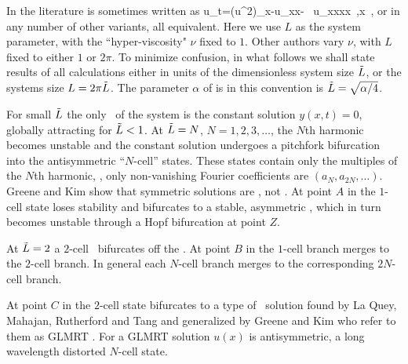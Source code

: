 In the literature  is sometimes written as
\beq
    u_t=(u^2)_x-u_{xx}- \nu \, u_{xxxx}
    \,,\qquad   x \in [0,L]
    \,,
or in any number of other variants, all equivalent.
Here we use
$L$ as the system parameter, with the ``hyper-viscosity" $\nu$ fixed to $1$.
Other authors vary  $\nu$, with $L$ fixed to either $1$ or $2\pi$.
To minimize confusion,
in what follows we shall state results of all 
calculations either in units of the dimensionless system size $\tilde{L}$,
or the systems size $L = 2 \pi \tilde{L}$. The parameter $\alpha$
of  is in this convention is
$\tilde{L}=\sqrt{\alpha/4}$.


For small $\tilde{L}$ the only \eqv\ of the system is the 
constant solution $y(x,t)=0$,
globally attracting 
for $\tilde{L}<1$. At $\tilde{L}=N$, $N=1,2,3, \dots$, 
the $N$th harmonic becomes unstable and the constant solution
undergoes a pitchfork bifurcation into
the antisymmetric ``$N$-cell'' states. 
These states contain only the multiples of the $N$th
harmonic, {\ie}, only non-vanishing Fourier coefficients
are $(a_N,a_{2N},\dots)$.
Greene and Kim show that symmetric solutions are \eqva, not \reqva. 
At point $A$ in 
the $1$-cell state loses stability
and bifurcates to a stable, 
asymmetric \reqv, which in turn becomes unstable
through a Hopf bifurcation at point $Z$. 


At $\tilde{L}=2$ a $2$-cell \eqv\ bifurcates off the  \eqv. 
At point $B$ in 
the $1$-cell branch merges to the $2$-cell branch. 
In general each $N$-cell branch merges to the corresponding $2N$-cell branch.

At point $C$ in 
the $2$-cell state bifurcates to a type of 
\eqv\ solution
found by La Quey, Mahajan, Rutherford and Tang and generalized by Greene and Kim who refer to them as GLMRT \eqva. 
For a GLMRT solution $u(x)$ is antisymmetric,
a long wavelength distorted $N$-cell state.


